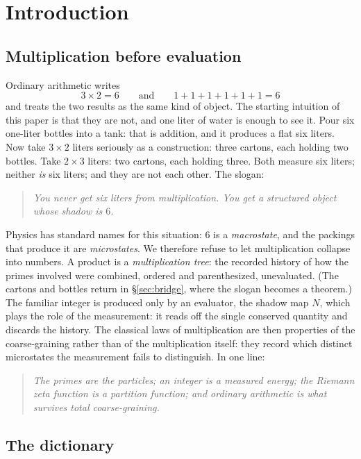 \documentclass[11pt]{article}
\numberwithin{equation}{section}
\theoremstyle{plain}
\theoremstyle{definition}
\theoremstyle{remark}
\begin{document}
\section{Introduction}

\subsection{Multiplication before evaluation}

Ordinary arithmetic writes
\[
3 \times 2 = 6
\qquad\text{and}\qquad
1+1+1+1+1+1 = 6
\]
and treats the two results as the same kind of object. The starting intuition of this
paper is that they are not, and one liter of water is enough to see it. Pour six
one-liter bottles into a tank: that is addition, and it produces a flat six liters.
Now take $3 \times 2$ liters seriously as a construction: three cartons, each holding
two bottles. Take $2 \times 3$ liters: two cartons, each holding three. Both measure
six liters; neither \emph{is} six liters; and they are not each other. The slogan:

\begin{quote}
\emph{You never get six liters from multiplication. You get a structured object whose
shadow is $6$.}
\end{quote}

Physics has standard names for this situation: $6$ is a \emph{macrostate}, and the
packings that produce it are \emph{microstates}. We therefore refuse to let
multiplication collapse into numbers. A product is a \emph{multiplication tree}: the
recorded history of how the primes involved were combined, ordered and parenthesized,
unevaluated. (The cartons and bottles return in \S\ref{sec:bridge}, where the slogan
becomes a theorem.) The familiar integer is produced only by an evaluator, the shadow
map $N$, which plays the role of the measurement: it reads off the single conserved
quantity and discards the history. The classical laws of multiplication are then
properties of the coarse-graining rather than of the multiplication itself: they
record which distinct microstates the measurement fails to distinguish. In one line:

\begin{quote}
\emph{The primes are the particles; an integer is a measured energy; the Riemann
zeta function is a partition function; and ordinary arithmetic is what survives total
coarse-graining.}
\end{quote}

\subsection{The dictionary}\label{sec:dictionary}
\end{document}
